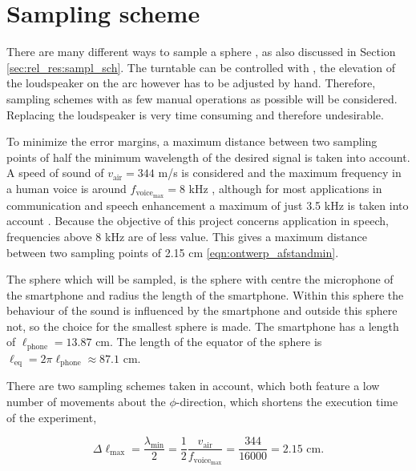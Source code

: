 \section{Sampling scheme}
\label{sec:sampl_scheme}
There are many different ways to sample a sphere \cite{Zhang2012575}, as also discussed in Section \ref{sec:rel_res:sampl_sch}.
The turntable can be controlled with \matlab, the elevation of the loudspeaker on the arc however has to be adjusted by hand. Therefore, sampling schemes with as few manual operations as possible will be considered.
Replacing the loudspeaker is very time consuming and therefore undesirable.

To minimize the error margins, a maximum distance between two sampling points of half the minimum wavelength of the desired signal is taken into account.
A speed of sound of $v_\text{air}=344$ m/s is considered and the maximum frequency in a human voice is around $f_{\text{voice}_\text{max}}=8$ kHz \cite{hospital}, although for most applications in communication and speech enhancement a maximum of just 3.5 kHz is taken into account \cite[p.~58]{book:jorge_speechenhancement}.
Because the objective of this project concerns application in speech, frequencies above 8 kHz are of less value.
This gives a maximum distance between two sampling points of 2.15 cm \eqref{eqn:ontwerp_afstandmin}.

The sphere which will be sampled, is the sphere with centre the microphone of the smartphone and radius the length of the smartphone.
Within this sphere the behaviour of the sound is influenced by the smartphone and outside this sphere not, so the choice for the smallest sphere is made.
The smartphone has a length of $\ell_\text{phone}=13.87$ cm. The length of the equator of the sphere is $\ell_\text{eq}=2\pi\ell_\text{phone}\approx87.1$ cm.

There are two sampling schemes taken in account, which both feature a low number of movements about the $\phi$-direction, which shortens the execution time of the experiment,

\begin{equation}
\label{eqn:ontwerp_afstandmin}
\Delta\ell_\text{max}=\dfrac{\lambda_\text{min}}{2}=\dfrac{1}{2}\dfrac{v_\text{air}}{f_{\text{voice}_\text{max}}}=\dfrac{344}{16000}=2.15\text{ cm}.
\end{equation}


